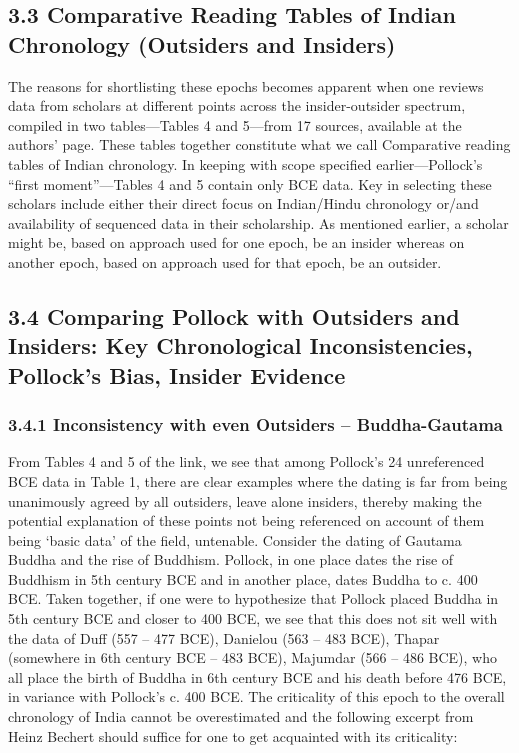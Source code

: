 \subsection*{3.3 Comparative Reading Tables of Indian Chronology (Outsiders and Insiders)}

The reasons for shortlisting these epochs becomes apparent when one reviews data from scholars at different points across the insider-outsider spectrum, compiled in two tables—Tables 4 and 5—from 17 sources, available at the authors’ page. These tables together constitute what we call Comparative reading tables of Indian chronology. In keeping with scope specified earlier—Pollock’s “first moment”—Tables 4 and 5 contain only BCE data. Key in selecting these scholars include either their direct focus on Indian/Hindu chronology or/and availability of sequenced data in their scholarship. As mentioned earlier, a scholar might be, based on approach used for one epoch, be an insider whereas on another epoch, based on approach used for that epoch, be an outsider.


\subsection*{3.4 Comparing Pollock with Outsiders and Insiders: Key Chronological Inconsistencies, Pollock’s Bias, Insider Evidence}

\subsubsection*{3.4.1 Inconsistency with even Outsiders – Buddha-Gautama}

From Tables 4 and 5 of the link, we see that among Pollock’s 24 unreferenced BCE data in Table 1, there are clear examples where the dating is far from being unanimously agreed by all outsiders, leave alone insiders, thereby making the potential explanation of these points not being referenced on account of them being ‘basic data’ of the field, untenable. Consider the dating of Gautama Buddha and the rise of Buddhism. Pollock, in one place dates the rise of Buddhism in 5th century BCE and in another place, dates Buddha to c. 400 BCE. Taken together, if one were to hypothesize that Pollock placed Buddha in 5th century BCE and closer to 400 BCE, we see that this does not sit well with the data of Duff (557 – 477 BCE), Danielou (563 – 483 BCE), Thapar (somewhere in 6th century BCE – 483 BCE), Majumdar (566 – 486 BCE), who all place the birth of Buddha in 6th century BCE and his death before 476 BCE, in variance with Pollock’s c. 400 BCE. The criticality of this epoch to the overall chronology of India cannot be overestimated and the following excerpt from Heinz Bechert should suffice for one to get acquainted with its criticality:

